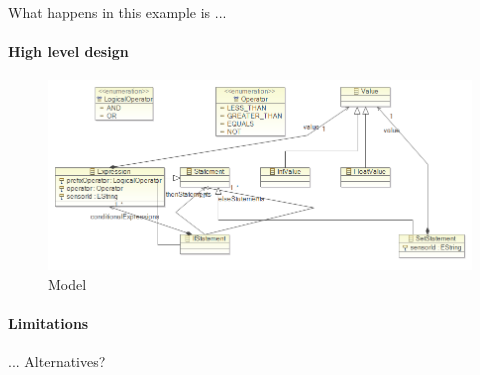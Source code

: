 What happens in this example is ...

\paragraph{High level design}

\begin{figure}[t]
\includegraphics[width=1.00\columnwidth]{model.png}
\caption{Model}
\end{figure}


\paragraph{Limitations}
... Alternatives?
